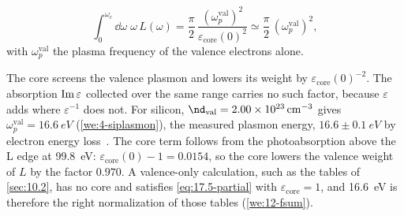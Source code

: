 \begin{keyresult}
\begin{equation}
  \int_0^{\omega_c}\dd\omega\;\omega\,L(\omega) = \frac{\pi}{2}\,\frac{(\omega_p^{\mathrm{val}})^2}{\varepsilon_{\mathrm{core}}(0)^2} \simeq \frac{\pi}{2}\,(\omega_p^{\mathrm{val}})^2 ,
  \label{eq:17.5-partial}
\end{equation}
with $\omega_p^{\mathrm{val}}$ the plasma frequency of the valence electrons alone.
\end{keyresult}
\noindent The core screens the valence plasmon and lowers its weight by $\varepsilon_{\mathrm{core}}(0)^{-2}$. The absorption $\operatorname{Im}\varepsilon$ collected over the same range carries no such factor, because $\varepsilon$ adds where $\varepsilon^{-1}$ does not. For silicon, $\nd_{\mathrm{val}} = \SI{2.00e23}{cm^{-3}}$ gives $\omega_p^{\mathrm{val}} = \SI{16.6}{eV}$ (\cref{we:4-siplasmon}), the measured plasmon energy, $16.6 \pm \SI{0.1}{eV}$ by electron energy loss~\cite[Table~I]{ramanathan2020ionization}. The core term follows from the photoabsorption above the L edge at \SI{99.8}{eV}: $\varepsilon_{\mathrm{core}}(0) - 1 = 0.0154$, so the core lowers the valence weight of $L$ by the factor $0.970$. A valence-only calculation, such as the tables of \cref{sec:10.2}, has no core and satisfies \cref{eq:17.5-partial} with $\varepsilon_{\mathrm{core}} = 1$, and \SI{16.6}{eV} is therefore the right normalization of those tables (\cref{we:12-fsum}).

